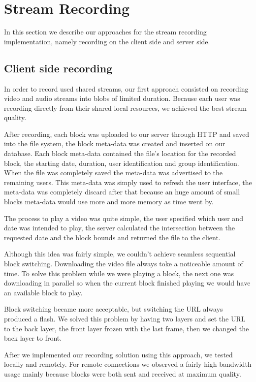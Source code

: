 \section{Stream Recording}
	In this section we describe our approaches for the stream recording implementation, namely recording on the client side and server side.

\subsection{Client side recording}
	In order to record used shared streams, our first approach consisted on recording video and audio streams into blobs of limited duration. Because each user was recording directly from their shared local resources, we achieved the best stream quality.

	After recording, each block was uploaded to our server through \ac{HTTP} and saved into the file system, the block meta-data was created and inserted on our database. Each block meta-data contained the file's location for the recorded block, the starting date, duration, user identification and group identification. When the file was completely saved the meta-data was advertised to the remaining users. This meta-data was simply used to refresh the user interface, the meta-data was completely discard after that because an huge amount of small blocks meta-data would use more and more memory as time went by. 

	The process to play a video was quite simple, the user specified which user and date was intended to play, the server calculated the intersection between the requested date and the block bounds and returned the file to the client.

	Although this idea was fairly simple, we couldn't achieve seamless sequential block switching. Downloading the video file always toke a noticeable amount of time. To solve this problem while we were playing a block, the next one was downloading in parallel so when the current block finished playing we would have an available block to play. 

	Block switching became more acceptable, but switching the \ac{URL} always produced a flash. We solved this problem by having two layers and set the \ac{URL} to the back layer, the front layer frozen with the last frame, then we changed the back layer to front. 

	After we implemented our recording solution using this approach, we tested locally and remotely. For remote connections we observed a fairly high bandwidth usage mainly because blocks were both sent and received at maximum quality. 


